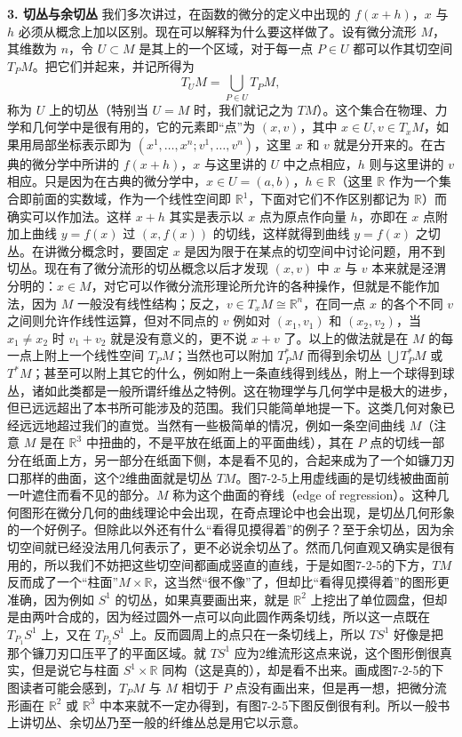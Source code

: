\noindent\textbf{3. 切丛与余切丛}\quad
我们多次讲过，在函数的微分的定义中出现的 $f(x+h)$，$x$ 与 $h$ 必须从概念上加以区别。现在可以解释为什么要这样做了。设有微分流形 $M$，其维数为 $n$，令 $U\subset M$ 是其上的一个区域，对于每一点 $P\in U$ 都可以作其切空间 $T_PM$。把它们并起来，并记所得为
\[
 T_UM=\bigcup_{P\in U}T_PM,
\]
称为 $U$ 上的切丛（特别当 $U=M$ 时，我们就记之为 $TM$）。这个集合在物理、力学和几何学中是很有用的，它的元素即“点”为 $(x,v)$，其中 $x\in U,v\in T_xM$，如果用局部坐标表示即为 $(x^1,\ldots,x^n;v^1,\ldots,v^n)$，这里 $x$ 和 $v$ 就是分开来的。在古典的微分学中所讲的 $f(x+h)$，$x$ 与这里讲的 $U$ 中之点相应，$h$ 则与这里讲的 $v$ 相应。只是因为在古典的微分学中，$x\in U=(a,b)$，$h\in\mathbb R$（这里 $\mathbb R$ 作为一个集合即前面的实数域，作为一个线性空间即 $\mathbb R^1$，下面对它们不作区别都记为 $\mathbb R$）而确实可以作加法。这样 $x+h$ 其实是表示以 $x$ 点为原点作向量 $h$，亦即在 $x$ 点附加上曲线 $y=f(x)$ 过 $(x,f(x))$ 的切线，这样就得到曲线 $y=f(x)$ 之切丛。在讲微分概念时，要固定 $x$ 是因为限于在某点的切空间中讨论问题，用不到切丛。现在有了微分流形的切丛概念以后才发现 $(x,v)$ 中 $x$ 与 $v$ 本来就是泾渭分明的：$x\in M$，对它可以作微分流形理论所允许的各种操作，但就是不能作加法，因为 $M$ 一般没有线性结构；反之，$v\in T_xM\cong\mathbb R^n$，在同一点 $x$ 的各个不同 $v$ 之间则允许作线性运算，但对不同点的 $v$ 例如对 $(x_1,v_1)$ 和 $(x_2,v_2)$，当 $x_1\ne x_2$ 时 $v_1+v_2$ 就是没有意义的，更不说 $x+v$ 了。以上的做法就是在 $M$ 的每一点上附上一个线性空间 $T_PM$；当然也可以附加 $T_P^*M$ 而得到余切丛 $\bigcup T_P^*M$ 或 $T^*M$；甚至可以附上其它的什么，例如附上一条直线得到线丛，附上一个球得到球丛，诸如此类都是一般所谓纤维丛之特例。这在物理学与几何学中是极大的进步，但已远远超出了本书所可能涉及的范围。我们只能简单地提一下。这类几何对象已经远远地超过我们的直觉。当然有一些极简单的情况，例如一条空间曲线 $M$（注意 $M$ 是在 $\mathbb R^3$ 中扭曲的，不是平放在纸面上的平面曲线），其在 $P$ 点的切线一部分在纸面上方，另一部分在纸面下侧，本是看不见的，合起来成为了一个如镰刀刃口那样的曲面，这个2维曲面就是切丛 $TM$。图7-2-5上用虚线画的是切线被曲面前一叶遮住而看不见的部分。$M$ 称为这个曲面的脊线（edge of regression）。这种几何图形在微分几何的曲线理论中会出现，在奇点理论中也会出现，是切丛几何形象的一个好例子。但除此以外还有什么“看得见摸得着”的例子？至于余切丛，因为余切空间就已经没法用几何表示了，更不必说余切丛了。然而几何直观又确实是很有用的，所以我们不妨把这些切空间都画成竖直的直线，于是如图7-2-5的下方，$TM$ 反而成了一个“柱面”$M\times\mathbb R$，这当然“很不像”了，但却比“看得见摸得着”的图形更准确，因为例如 $S^1$ 的切丛，如果真要画出来，就是 $\mathbb R^2$ 上挖出了单位圆盘，但却是由两叶合成的，因为经过圆外一点可以向此圆作两条切线，所以这一点既在 $T_{P_1}S^1$ 上，又在 $T_{P_2}S^1$ 上。反而圆周上的点只在一条切线上，所以 $TS^1$ 好像是把那个镰刀刃口压平了的平面区域。就 $TS^1$ 应为2维流形这点来说，这个图形倒很真实，但是说它与柱面 $S^1\times\mathbb R$ 同构（这是真的），却是看不出来。画成图7-2-5的下图读者可能会感到，$T_PM$ 与 $M$ 相切于 $P$ 点没有画出来，但是再一想，把微分流形画在 $\mathbb R^2$ 或 $\mathbb R^3$ 中本来就不一定办得到，有图7-2-5下图反倒很有利。所以一般书上讲切丛、余切丛乃至一般的纤维丛总是用它以示意。

